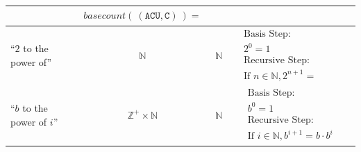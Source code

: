 \documentclass[12pt, oneside]{article}
\newcommand{\A}[0]{\texttt{A}}
\newcommand{\C}[0]{\texttt{C}}
\newcommand{\U}[0]{\texttt{U}}
\begin{document}
\begin{center}
\begin{tabular}{p{0.65in}ccp{2.4in}p{2.4in}}
{\begin{align*}
    \end{align*}} & 
    {\begin{align*}
        basecount(~(\A\C\U, \C)~) = 
    \end{align*}}\\
\hline
``$2$ to the power of''& $\mathbb{N}$ & $\mathbb{N}$ & 
{\begin{align*}    
&\textrm{Basis Step:} \\
&2^0= 1 \\
&\textrm{Recursive Step:}\\
&\textrm{If } n \in \mathbb{N}, 2^{n+1} = \phantom{2 \cdot 2^n}
\end{align*}}\\
\hline
``$b$ to the power of $i$''& $\mathbb{Z}^+ \times \mathbb{N}$ & $\mathbb{N}$ & 
{\begin{align*}    
&\textrm{Basis Step:} \\
&b^0 = 1 \\
&\textrm{Recursive Step:}\\
&\textrm{If } i \in \mathbb{N}, b^{i+1} = b \cdot b^i
\end{align*}}
\end{tabular}
\end{center}

\newpage \vfill
\end{document}
